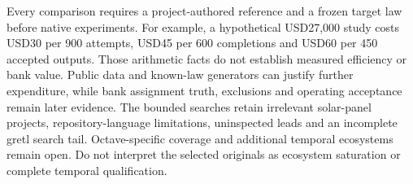 Every comparison requires a project-authored reference and a frozen target law before native experiments. For example, a hypothetical USD27,000 study costs USD30 per 900 attempts, USD45 per 600 completions and USD60 per 450 accepted outputs. Those arithmetic facts do not establish measured efficiency or bank value. Public data and known-law generators can justify further expenditure, while bank assignment truth, exclusions and operating acceptance remain later evidence. The bounded searches retain irrelevant solar-panel projects, repository-language limitations, uninspected leads and an incomplete gretl search tail. Octave-specific coverage and additional temporal ecosystems remain open. Do not interpret the selected originals as ecosystem saturation or complete temporal qualification.~\citep{exec25_odyn_choice}
